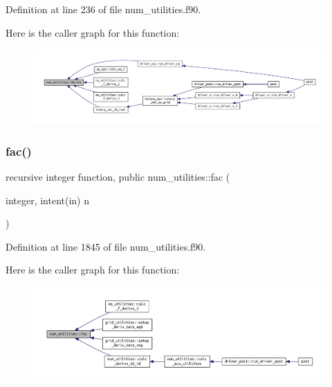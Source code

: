 Definition at line 236 of file num\+\_\+utilities.\+f90.

Here is the caller graph for this function\+:
\nopagebreak
\begin{figure}[H]
\begin{center}
\leavevmode
\includegraphics[width=350pt]{namespacenum__utilities_ac827c18dd05a9b5a06675eac942f3b51_icgraph}
\end{center}
\end{figure}
\mbox{\label{namespacenum__utilities_a43ab60f9e202b55221373286a5bbb954}} 
\subsubsection{\texorpdfstring{fac()}{fac()}}
{\footnotesize\ttfamily recursive integer function, public num\+\_\+utilities\+::fac (\begin{DoxyParamCaption}\item[{integer, intent(in)}]{n }\end{DoxyParamCaption})}



Definition at line 1845 of file num\+\_\+utilities.\+f90.

Here is the caller graph for this function\+:
\nopagebreak
\begin{figure}[H]
\begin{center}
\leavevmode
\includegraphics[width=350pt]{namespacenum__utilities_a43ab60f9e202b55221373286a5bbb954_icgraph}
\end{center}
\end{figure}
\mbox{\label{namespacenum__utilities_a3d0d04a582b3a528fc7f9975d5d2a807}} 
